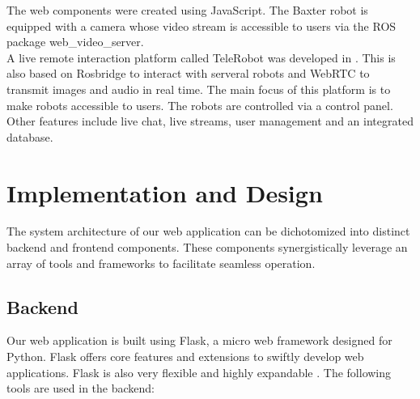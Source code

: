 \documentclass[conference]{IEEEtran}
\begin{document}
The web components were created using JavaScript. The Baxter robot is equipped with a camera whose video stream is accessible to users via the ROS package web\_video\_server.\\
A live remote interaction platform called TeleRobot was developed in \cite{wang}. This is also based on Rosbridge to interact with serveral robots and WebRTC to transmit images and audio in real time. The main focus of this platform is to make robots accessible to users. The robots are controlled via a control panel. Other features include live chat, live streams, user management and an integrated database.

\section{Implementation and Design}
The system architecture of our web application can be dichotomized into distinct backend and frontend components. These components synergistically leverage an array of tools and frameworks to facilitate seamless operation.

\subsection{Backend}
Our web application is built using Flask, a micro web framework designed for Python.
Flask offers core features and extensions to swiftly develop web applications. Flask is also very flexible and highly expandable \cite{flasksqlite}. The following tools are used in the backend:
\end{document}
